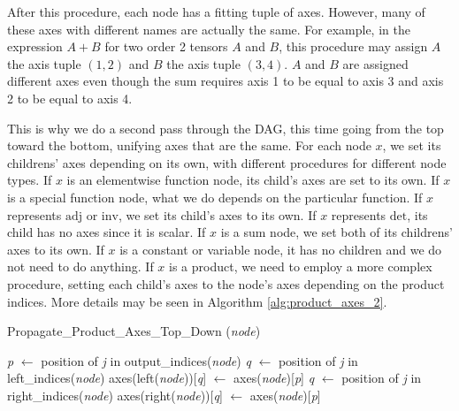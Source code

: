 \documentclass[12pt, a4paper]{report}
\begin{document}
After this procedure, each node has a fitting tuple of axes.
However, many of these axes with different names are actually the same.
For example, in the expression $A + B$ for two order 2 tensors $A$ and $B$, this procedure may assign $A$ the axis tuple $(1,2)$ and $B$ the axis tuple $(3,4)$.
$A$ and $B$ are assigned different axes even though the sum requires axis 1 to be equal to axis 3 and axis 2 to be equal to axis 4.

This is why we do a second pass through the DAG, this time going from the top toward the bottom, unifying axes that are the same.
For each node $x$, we set its childrens' axes depending on its own, with different procedures for different node types.
If $x$ is an elementwise function node, its child's axes are set to its own.
If $x$ is a special function node, what we do depends on the particular function.
If $x$ represents $\text{adj}$ or $\text{inv}$, we set its child's axes to its own.
If $x$ represents $\text{det}$, its child has no axes since it is scalar.
If $x$ is a sum node, we set both of its childrens' axes to its own.
If $x$ is a constant or variable node, it has no children and we do not need to do anything.
If $x$ is a product, we need to employ a more complex procedure, setting each child's axes to the node's axes depending on the product indices.
More details may be seen in Algorithm \ref{alg:product_axes_2}.

\begin{algorithm}
    \caption{Propagate\_Product\_Axes\_Top\_Down (\textit{node})}
    \label{alg:product_axes_2}
    \begin{algorithmic}
            \State \textit{p} $\gets$ position of \textit{j} in output\_indices(\textit{node})
                \State \textit{q} $\gets$ position of \textit{j} in left\_indices(\textit{node})
                    \State axes(left(\textit{node}))[\textit{q}] $\gets$ axes(\textit{node})[\textit{p}]
                \EndIf
            \EndFor
                \State \textit{q} $\gets$ position of \textit{j} in right\_indices(\textit{node})
                    \State axes(right(\textit{node}))[\textit{q}] $\gets$ axes(\textit{node})[\textit{p}]
                \EndIf
            \EndFor
        \EndFor
    \end{algorithmic}
\end{algorithm}
\end{document}
